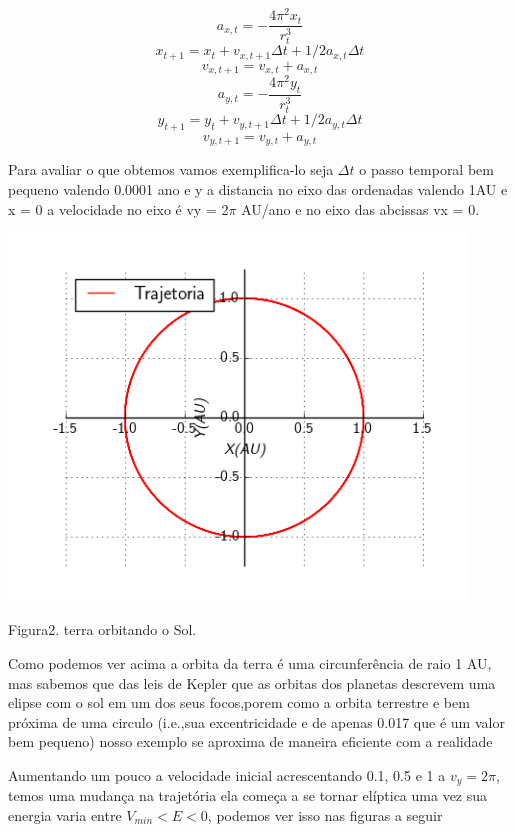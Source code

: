\documentclass[a4paper]{article} %
\begin{document}
\[a_{x,t} = -\frac{4\pi^2x_t}{r_t^3}\]
\[x_{t+1} = x_t +v_{x,t+1}\Delta{t} + 1/2a_{x,t}\Delta{t} \]
\[v_{x,t+1} = v_{x,t} + a_{x,t}\] 
\[a_{y,t} = -\frac{4\pi^2y_t}{r_t^3}\]
\[y_{t+1} = y_t +v_{y,t+1}\Delta{t} + 1/2a_{y,t}\Delta{t} \]
\[v_{y,t+1} = v_{y,t} + a_{y,t}\] 

Para avaliar o que obtemos vamos exemplifica-lo seja $\Delta{t}$ o passo temporal bem pequeno valendo 0.0001 ano e y a distancia no eixo das ordenadas valendo 1AU e x = 0 a velocidade no eixo é vy = 2$\pi$ AU/ano e no eixo das abcissas vx = 0.

\begin{center}
	\includegraphics[width=4.80in,height=3.84in, keepaspectratio=false]{image1_15-50-59-772000.png}
	
	\scriptsize{Figura2. terra orbitando o Sol.}
\end{center}

Como podemos ver acima a orbita da terra \'{e} uma circunfer\^{e}ncia de raio 1 AU, mas sabemos que das leis de Kepler que as orbitas dos planetas descrevem uma elipse com o sol em um dos seus focos,porem como a orbita terrestre e bem pr\'{o}xima de uma circulo (i.e.,sua excentricidade e de apenas 0.017 que \'{e} um valor bem pequeno) nosso exemplo se aproxima de maneira eficiente com a realidade

Aumentando um pouco a velocidade inicial acrescentando 0.1, 0.5 e 1 a $v_y = 2\pi$, temos uma mudança na trajetória ela começa a se tornar elíptica uma vez sua energia varia entre $V_{min} < E < 0$, podemos ver isso nas figuras a seguir 
\end{document}
